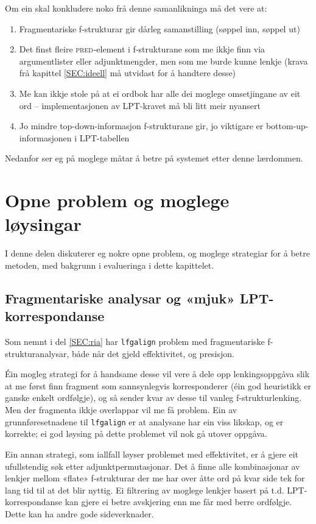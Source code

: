 \documentclass[12pt,a4paper,oneside,draft]{report}
\newcommand{\F}[2]{\textsc{#1}\ensuremath{_{#2}}}
\newcommand{\PRED}{\F{pred}{}}
\begin{document}
Om ein skal konkludere noko frå denne samanlikninga må det vere at:
\begin{enumerate}
\item Fragmentariske f\hyp{}strukturar gir dårleg samanstilling (søppel
   inn, søppel ut)
\item Det finst fleire \PRED{}-element i f\hyp{}strukturane som me ikkje finn
   via argumentlister eller adjunktmengder, men som me burde kunne
   lenkje (krava frå kapittel \ref{SEC:ideell} må utvidast for å
   handtere desse)
\item Me kan ikkje stole på at ei ordbok har alle dei moglege
   omsetjingane av eit ord -- implementasjonen av LPT-kravet må
   bli litt meir nyansert
\item Jo mindre top-down-informasjon f\hyp{}strukturane gir, jo viktigare er
   bottom-up-informasjonen i LPT-tabellen
\end{enumerate}
Nedanfor ser eg på moglege måtar å betre på systemet etter denne
lærdommen.

\section{Opne problem og moglege løysingar}
\label{sec-5.4}

   \label{SEC:opneproblem}

I denne delen diskuterer eg nokre opne problem, og moglege strategiar
for å betre metoden, med bakgrunn i evalueringa i dette kapittelet.

\subsection{Fragmentariske analysar og «mjuk» LPT\hyp{}korrespondanse}
\label{sec-5.4.1}

Som nemnt i del \ref{SEC:ria} har \texttt{lfgalign} problem med
 fragmentariske f\hyp{}strukturanalysar, både når det gjeld effektivitet,
 og presisjon.

Éin mogleg strategi for å handsame desse vil vere å dele opp
 lenkingsoppgåva slik at me først finn fragment som sannsynlegvis
 korresponderer (éin god heuristikk er ganske enkelt ordfølgje), og så
 sender kvar av desse til vanleg f\hyp{}strukturlenking. Men der fragmenta
 ikkje overlappar vil me få problem. Ein av grunnføresetnadene til
 \texttt{lfgalign} er at analysane har ein viss likskap, og er korrekte; ei
 god løysing på dette problemet vil nok gå utover oppgåva.

Ein annan strategi, som iallfall løyser problemet med effektivitet, er
 å gjere eit ufullstendig søk etter adjunktpermutasjonar. Det å finne
 alle kombinasjonar av lenkjer mellom «flate» f\hyp{}strukturar der me har
 over åtte ord på kvar side tek for lang tid til at det blir
 nyttig. Ei filtrering av moglege lenkjer basert på
 t.d. LPT\hyp{}korrespondanse kan gjere ei betre avskjering enn me får med
 berre ordfølgje. Dette kan ha andre gode sideverknader.
\end{document}
